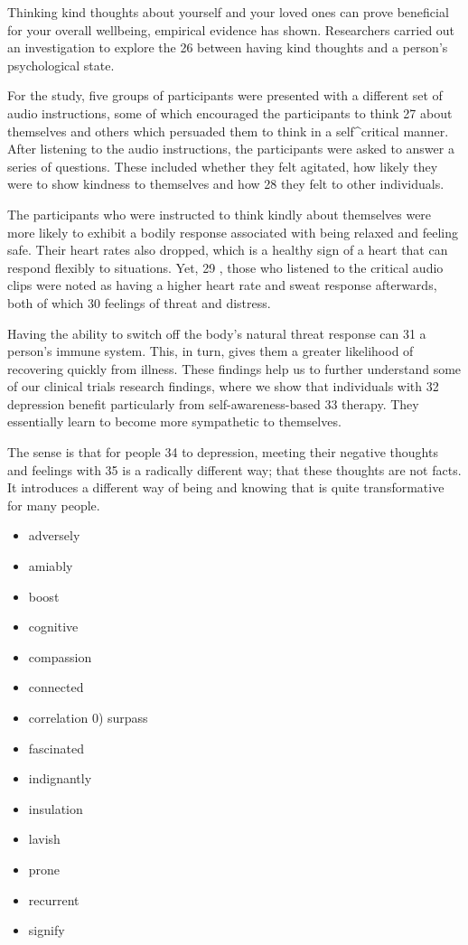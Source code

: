 \documentclass[UTF8,11pt]{ctexart}
\begin{document}
Thinking kind thoughts about yourself and your loved ones can prove beneficial for your overall wellbeing, empirical evidence has shown. Researchers carried out an investigation to explore the 26 between having kind thoughts and a person's psychological state.


For the study, five groups of participants were presented with a different set of audio instructions, some of which encouraged the participants to think 27 about themselves and others which persuaded them to think in a self\textasciicircum{}critical manner. After listening to the audio instructions, the participants were asked to answer a series of questions. These included whether they felt agitated, how likely they were to show kindness to themselves and how 28 they felt to other individuals.


The participants who were instructed to think kindly about themselves were more likely to exhibit a bodily response associated with being relaxed and feeling safe. Their heart rates also dropped, which is a healthy sign of a heart that can respond flexibly to situations. Yet, 29 , those who listened to the critical audio clips were noted as having a higher heart rate and sweat response afterwards, both of which 30 feelings of threat and distress.


Having the ability to switch off the body's natural threat response can 31 a person's immune system. This, in turn, gives them a greater likelihood of recovering quickly from illness. These findings help us to further understand some of our clinical trials research findings, where we show that individuals with 32 depression benefit particularly from self-awareness-based 33 therapy. They essentially learn to become more sympathetic to themselves.


The sense is that for people 34 to depression, meeting their negative thoughts and feelings with 35 is a radically different way; that these thoughts are not facts. It introduces a different way of being and knowing that is quite transformative for many people.


\begin{itemize}[leftmargin=2em,itemsep=.2em,topsep=.4em]\item[A.] adversely
\item[B.] amiably
\item[C.] boost
\item[D.] cognitive
\item[E.] compassion
\item[F.] connected
\item[G.] correlation 0) surpass
\item[H.] fascinated
\item[I.] indignantly
\item[J.] insulation
\item[K.] lavish
\item[L.] prone
\item[M.] recurrent
\item[N.] signify
\end{itemize}
\end{document}
